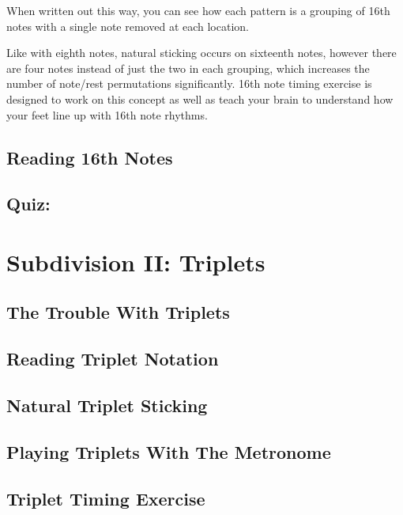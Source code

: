 \documentclass[12pt,letterpaper]{book}
\begin{document}
When written out this way, you can see how each pattern is a grouping of 16th notes with a single note removed at each location.

Like with eighth notes, natural sticking occurs on sixteenth notes, however there are four notes instead of just the two in each grouping, which increases the number of note/rest permutations significantly.  16th note timing exercise is designed to work on this concept as well as teach your brain to understand how your feet line up with 16th note rhythms.

\subsection{Reading 16th Notes}

\subsection{Quiz:}



\section{Subdivision II: Triplets}

\subsection{The Trouble With Triplets}

\subsection{Reading Triplet Notation}

\subsection{Natural Triplet Sticking}

\subsection{Playing Triplets With The Metronome}

\subsection{Triplet Timing Exercise}
\end{document}
